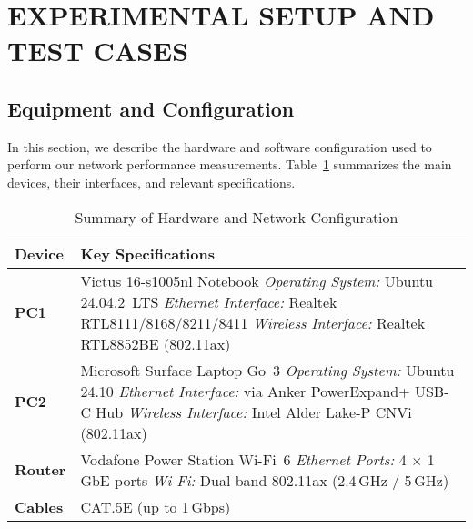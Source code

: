 
\section{EXPERIMENTAL SETUP AND TEST CASES} \label{sec:experimental-setup-and-test-cases}

\subsection{Equipment and Configuration} \label{subsec:equipment-and-configuration}

In this section, we describe the hardware and software configuration used to perform our network performance measurements. Table~\ref{tab:equipment-summary} summarizes the main devices, their interfaces, and relevant specifications. 

\begin{table}[ht]
    \small
    \centering
    \caption{Summary of Hardware and Network Configuration}
    \label{tab:equipment-summary}
    \begin{tabular}{@{}l p{}@{}}
    \toprule
    \textbf{Device} & \textbf{Key Specifications} \\
    \midrule
    \textbf{PC1} 
        & Victus 16-s1005nl Notebook \newline
          \textit{Operating System:} Ubuntu 24.04.2~LTS \newline
          \textit{Ethernet Interface:} Realtek RTL8111/8168/8211/8411 \newline
          \textit{Wireless Interface:} Realtek RTL8852BE (802.11ax) \\
    \midrule
    \textbf{PC2} 
        & Microsoft Surface Laptop Go~3 \newline
          \textit{Operating System:} Ubuntu 24.10 \newline
          \textit{Ethernet Interface:} via Anker PowerExpand+ USB-C Hub \newline
          \textit{Wireless Interface:} Intel Alder Lake-P CNVi (802.11ax) \\
    \midrule
    \textbf{Router} 
        & Vodafone Power Station Wi-Fi~6 \newline
          \textit{Ethernet Ports:} 4 $\times$ 1\,GbE ports \newline
          \textit{Wi-Fi:} Dual-band 802.11ax (2.4\,GHz / 5\,GHz) \\
    \midrule
    \textbf{Cables} 
        & CAT.5E (up to 1\,Gbps) \\
    \bottomrule
    \end{tabular}
\end{table}

